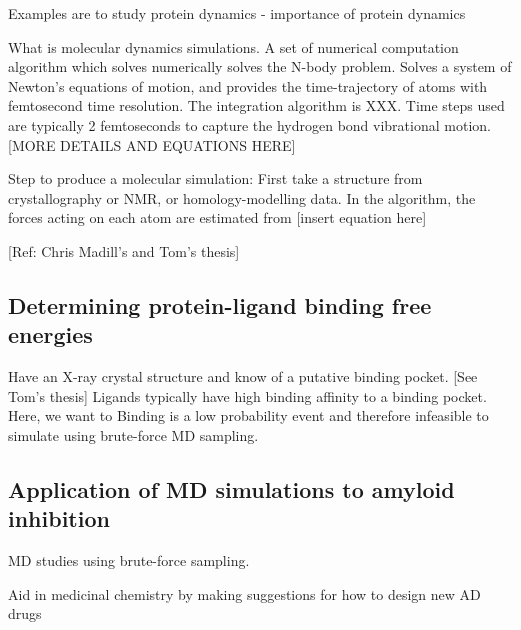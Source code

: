 

Examples are to study protein dynamics - importance of protein dynamics

What is molecular dynamics simulations. A set of numerical computation algorithm which solves numerically solves the N-body problem. Solves a system of Newton's equations of motion, and provides the time-trajectory of atoms with femtosecond time resolution. The integration algorithm is XXX. Time steps used are typically 2 femtoseconds to capture the hydrogen bond vibrational motion. [MORE DETAILS AND EQUATIONS HERE]

Step to produce a molecular simulation:
First take a structure from crystallography or NMR, or homology-modelling data.
In the algorithm, the forces acting on each atom are estimated from [insert equation here]

[Ref: Chris Madill's and Tom's thesis]


\subsection{Determining protein-ligand binding free energies}
Have an X-ray crystal structure and know of a putative binding pocket. [See Tom's thesis]
Ligands typically have high binding affinity to a binding pocket. Here, we want to  Binding is a low probability event and therefore infeasible to simulate using brute-force MD sampling.

\subsection{Application of MD simulations to amyloid inhibition}
MD studies using brute-force sampling.

Aid in medicinal chemistry by making suggestions for how to design new AD drugs